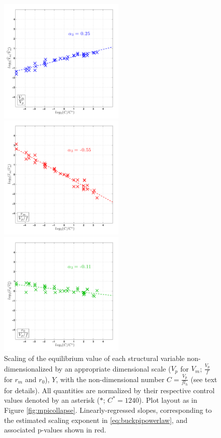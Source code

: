 \documentclass[12pt]{article}
\begin{document}
\begin{figure}[h!]
\centering
  \noindent\includegraphics[width=6cm,height=6cm]{FIGURES_TC_RCE_equilibrium_v2.0/Fig7a_Nondimensional_scaling_V.pdf}
  
  \noindent\includegraphics[width=6cm,height=6cm]{FIGURES_TC_RCE_equilibrium_v2.0/Fig7b_Nondimensional_scaling_rm.pdf}
  
  \noindent\includegraphics[width=6cm,height=6cm]{FIGURES_TC_RCE_equilibrium_v2.0/Fig7c_Nondimensional_scaling_r0.pdf}

\caption{Scaling of the equilibrium value of each structural variable non-dimensionalized by an appropriate dimensional scale ($V_p$ for $V_m$; $\frac{V_p}{f}$ for $r_m$ and $r_0$), $Y$, with the non-dimensional number $C = \frac{V_p}{fl_h}$ (see text for details). All quantities are normalized by their respective control values denoted by an asterisk ($*$; $C^* = 1240$). Plot layout as in Figure \ref{fig:mpicollapse}.  Linearly-regressed slopes, corresponding to the estimated scaling exponent in \eqref{eq:buckpipowerlaw}, and associated p-values shown in red.}\label{fig:nondimscaling}
\end{figure}
\end{document}
